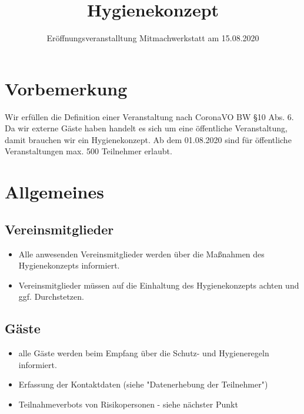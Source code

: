 \documentclass[10pt,a4paper]{scrartcl}
\title{Hygienekonzept}
\subtitle{Eröffnungsveranstalltung Mitmachwerkstatt am 15.08.2020}
\date{\vspace{-8ex}}
\begin{document}

\maketitle
\section{Vorbemerkung}
Wir erfüllen die Definition einer Veranstaltung nach CoronaVO BW §10 Abs. 6.
Da wir externe Gäste haben handelt es sich um eine öffentliche Veranstaltung, damit brauchen wir ein Hygienekonzept.
Ab dem 01.08.2020 sind für öffentliche Veranstaltungen max. 500 Teilnehmer erlaubt.

\section{Allgemeines}
\subsection{Vereinsmitglieder}
\begin{itemize}
\item Alle anwesenden Vereinsmitglieder werden über die Maßnahmen des Hygienekonzepts informiert.
\item Vereinsmitglieder müssen auf die Einhaltung des Hygienekonzepts achten und ggf. Durchstetzen.
\end{itemize}


\subsection{Gäste}
\begin{itemize}
\item alle Gäste werden beim Empfang über die Schutz- und Hygieneregeln informiert.
\item Erfassung der Kontaktdaten (siehe "Datenerhebung der Teilnehmer")
\item Teilnahmeverbots von Risikopersonen - siehe nächster Punkt
\end{itemize}
\end{document}
